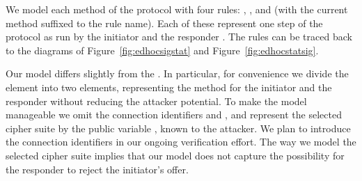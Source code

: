 We model each method of the protocol with four rules: , , 
and  (with the current method suffixed to the rule name).
%
Each of these represent one step of the protocol as run by the initiator 
and the responder .
%
The rules can be traced back to the diagrams of
Figure~\ref{fig:edhocsigstat} and Figure~\ref{fig:edhocstatsig}.
%

Our model differs slightly from the \mSpec{}.
%
In particular, for convenience we divide the \mMethod{} element into two
elements, representing the method for the initiator and the responder without
reducing the attacker potential.
%
To make the model manageable we omit the connection identifiers \mCi{} and
\mCr{}, and represent the selected cipher suite by the public variable
, known to the attacker.
%
We plan to introduce the connection identifiers in our ongoing verification
effort.
%
The way we model the selected cipher suite implies that our model does not
capture the possibility for the responder to reject the initiator's offer. 
%

